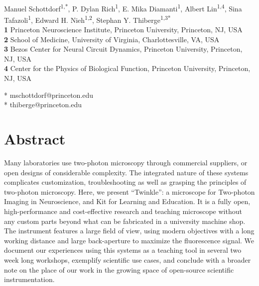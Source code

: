 \documentclass[10pt,letterpaper]{article}
\begin{document}
\vspace*{0.2in}

\begin{flushleft}
{\Large
\textbf{}
}
\newline
\\
Manuel Schottdorf\textsuperscript{1,*},
P. Dylan Rich\textsuperscript{1},
E. Mika Diamanti\textsuperscript{1}, 
Albert Lin\textsuperscript{1,4}, 
Sina Tafazoli\textsuperscript{1},
Edward H. Nieh\textsuperscript{1,2},
Stephan Y. Thiberge\textsuperscript{1,3*}
\\
\bigskip
\textbf{1} Princeton Neuroscience Institute, Princeton University, Princeton, NJ, USA\\
\textbf{2} School of Medicine, University of Virginia, Charlottesville, VA, USA \\
\textbf{3} Bezos Center for Neural Circuit Dynamics, Princeton University, Princeton, NJ, USA\\
\textbf{4} Center for the Physics of Biological Function, Princeton University, Princeton, NJ, USA\\
\bigskip

* mschottdorf@princeton.edu\\
* thiberge@princeton.edu

\end{flushleft}
\section*{Abstract}
Many laboratories use two-photon microscopy through commercial suppliers, or open designs of considerable complexity. The integrated nature of these systems complicates customization, troubleshooting as well as grasping the principles of two-photon microscopy. Here, we present ``Twinkle'': a microscope for Two-photon Imaging in Neuroscience, and Kit for Learning and Education. It is a fully open, high-performance and cost-effective research and teaching microscope without any custom parts beyond what can be fabricated in a university machine shop. The instrument features a large field of view, using modern objectives with a long working distance and large back-aperture to maximize the fluorescence signal. We document our experiences using this systems as a teaching tool in several two week long workshops, exemplify scientific use cases, and conclude with a broader note on the place of our work in the growing space of open-source scientific instrumentation.
\end{document}
